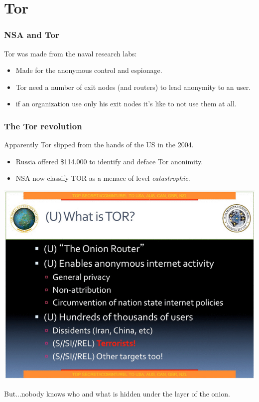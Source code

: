 \section{Tor}
\begin{frame}
	\frametitle{NSA and Tor}
	Tor was made from the naval research labs:
	\begin{itemize}
		\item Made for the anonymous control and espionage.
		\item Tor need a number of exit nodes (and routers) to lead
		anonymity to an user.
		\item if an organization use only his exit nodes it's like to
		not use them at all.
	\end{itemize}
\end{frame}

\begin{frame}
	\frametitle{The Tor revolution}
	Apparently Tor slipped from the hands of the US in the 2004.
	\begin{minipage}{.49\textwidth}

	\begin{itemize}
		\item Russia offered \$114.000 to identify and deface Tor
		anonimity.
		\item NSA now classify TOR as a menace of level
		\textit{catastrophic}.
	\end{itemize}
	\end{minipage}
	\begin{minipage}{.5\textwidth}
		\includegraphics[scale=0.35]{imgs/nsa_tor}
	\end{minipage}
	But...nobody knows who and what is hidden under the layer of the onion.
\end{frame}
